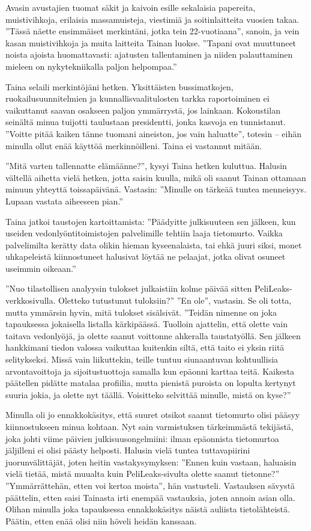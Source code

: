 ﻿\documentclass[a4paper, 12pt, finnish]{article}
\newcommand{\q}[1]{''#1''}  %
\begin{document}
Avasin avustajien tuomat säkit ja kaivoin esille sekalaisia
papereita, muistivihkoja, erilaisia massamuisteja, viestimiä
ja soitinlaitteita vuosien takaa.
\q{Tässä näette ensimmäiset merkintäni, jotka tein 22-vuotiaana},
sanoin, ja vein kasan muistivihkoja ja muita laitteita Tainan
luokse. \q{Tapani ovat muuttuneet noista ajoista huomattavasti:
ajatusten tallentaminen ja niiden palauttaminen mieleen on
nykytekniikalla paljon helpompaa.}

Taina selaili merkintöjäni hetken. Yksittäisten bussimatkojen,
ruokailusuunnitelmien ja kunnallisvaalitulosten tarkka raportoiminen
ei vaikuttanut saavan osakseen paljon ymmärrystä, jos lainkaan.
Kokoustilan seinältä minua tuijotti taulustaan presidentti,
jonka kasvoja en tunnistanut. \q{Voitte pitää kaiken tänne
tuomani aineiston, jos vain haluatte}, totesin -- eihän minulla
ollut enää käyttöä merkinnöilleni.
Taina ei vastannut mitään.

\q{Mitä varten tallennatte elämäänne?}, kysyi Taina hetken kuluttua.
Halusin vältellä aihetta vielä hetken, jotta saisin kuulla,
mikä oli saanut Tainan ottamaan minuun yhteyttä
toissapäivänä. Vastasin: \q{Minulle on tärkeää tuntea menneisyys.
Lupaan vastata aiheeseen pian.}

Taina jatkoi taustojen kartoittamista: \q{Päädyitte julkisuuteen
sen jälkeen, kun useiden vedonlyöntitoimistojen palvelimille
tehtiin laaja tietomurto. Vaikka palvelimilta kerätty data olikin
hieman kyseenalaista, tai ehkä juuri siksi, monet uhkapeleistä
kiinnostuneet halusivat löytää ne pelaajat, jotka olivat osuneet
useimmin oikeaan.}

\q{Nuo tilastollisen analyysin tulokset julkaistiin kolme päivää
sitten PeliLeaks-verkkosivulla. Oletteko tutustunut tuloksiin?}
\q{En ole}, vastasin. Se oli totta, mutta ymmärsin hyvin, mitä tulokset sisälsivät.
\q{Teidän nimenne on joka tapauksessa jokaisella listalla kärkipäässä.
Tuolloin ajattelin, että olette vain taitava vedonlyöjä, ja olette
saanut voittonne ahkeralla taustatyöllä. Sen jälkeen hankkimani
tiedon valossa vaikuttaa kuitenkin siltä, että taito ei yksin riitä
selitykseksi. Missä vain liikuttekin, teille tuntuu siunaantuvan kohtuullisia 
arvontavoittoja ja sijoitustuottoja samalla kun epäonni karttaa teitä.
Kaikesta päätellen pidätte matalaa profiilia, mutta pienistä
puroista on lopulta kertynyt suuria jokia, ja olette nyt täällä.
Voisitteko selvittää minulle, mistä on kyse?}

Minulla oli jo ennakkokäsitys, että suuret otsikot saanut tietomurto
olisi pääsyy kiinnostukseen minua kohtaan. Nyt sain varmistuksen
tärkeimmästä tekijästä, joka johti viime päivien
julkisuusongelmiini: ilman epäonnista tietomurtoa jäljilleni ei olisi
päästy helposti. Halusin vielä tuntea tuttavapiirini
juorunvälittäjät, joten heitin vastakysymyksen:
\q{Ennen kuin vastaan, haluaisin vielä tietää,
mistä muualta kuin PeliLeaks-sivulta olette saanut tietonne?}
\q{Ymmärrättehän, etten voi kertoa moista}, hän vastusteli. 
Vastauksen sävystä päättelin, etten saisi Tainasta
irti enempää vastauksia, joten annoin asian olla.
Olihan minulla joka tapauksessa ennakkokäsitys näistä auliista
tietolähteistä. Päätin, etten enää olisi niin höveli heidän kanssaan.
\end{document}
